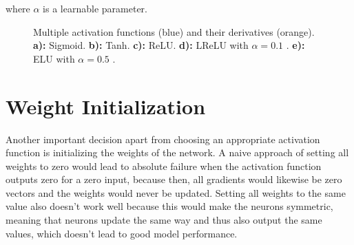 \noindent where $\alpha$ is a learnable parameter.


\begin {figure}[!ht]
	\begin{center}
	\begin {subfigure}[{position=b}]{0.3\linewidth}
		\scalebox{0.60}{}
		\caption{}
	\end {subfigure}
	\begin {subfigure}[{position=b}]{0.3\linewidth}
		\scalebox{0.60}{}
		\caption{}
	\end {subfigure}
	\end{center}

	\begin {center}
	\begin {subfigure}[{position=b}]{0.3\linewidth}
		\scalebox{0.60}{}
		\caption{}
	\end {subfigure}
	\begin {subfigure}[{position=b}]{0.3\linewidth}
		\scalebox{0.60}{}
		\caption{}
	\end {subfigure}
	\begin {subfigure}[{position=b}]{0.3\linewidth}
		\scalebox{0.60}{}
		\caption{}
	\end {subfigure}
	\end{center}

		\caption[Multiple activation functions.]{Multiple activation functions (blue) and their derivatives (orange). \textbf{a):} Sigmoid. \textbf{b):} Tanh. \textbf{c):} ReLU. \textbf{d):} LReLU with $\alpha = 0.1$ . \textbf{e):} ELU with $\alpha = 0.5$ .}
		\label{fig:activation_functions}

\end {figure}



	\section{Weight Initialization}
\label{sec:weight_init}
Another important decision apart from choosing an appropriate activation function is initializing the weights of the network. A naive approach of setting all weights to zero would lead to absolute failure when the activation function outputs zero for a zero input, because then, all gradients would likewise be zero vectors and the weights would never be updated. Setting all weights to the same value also doesn't work well because this would make the neurons symmetric, meaning that neurons update the same way and thus also output the same values, which doesn't lead to good model performance.

